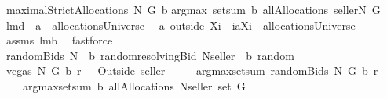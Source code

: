 \begin{isabellebody}
\ {\isachardoublequoteopen}maximalStrictAllocations{\isacharprime}\ N\ G\ b{\isacharequal}{\isacharequal}\isanewline
argmax\ {\isacharparenleft}setsum\ b{\isacharparenright}\ {\isacharparenleft}allAllocations\ {\isacharparenleft}{\isacharbraceleft}seller{\isacharbraceright}{\isasymunion}N{\isacharparenright}\ G{\isacharparenright}{\isachardoublequoteclose}\isanewline
\isanewline
\isanewline
\isanewline
{}\isamarkupfalse%
\ lm{}{}d{\isacharcolon}\ \ {\isachardoublequoteopen}a\ {\isasymin}\ allocationsUniverse{\isachardoublequoteclose}\ \ \isanewline
{\isachardoublequoteopen}{\isacharparenleft}a\ outside\ {\isacharparenleft}X{\isasymunion}{\isacharbraceleft}i{\isacharbraceright}{\isacharparenright}{\isacharparenright}\ {\isasymunion}\ {\isacharparenleft}{\isacharbraceleft}i{\isacharbraceright}{\isasymtimes}{\isacharparenleft}{\isacharbraceleft}{\isasymUnion}{\isacharparenleft}a{\isacharbackquote}{\isacharbackquote}{\isacharparenleft}X{\isasymunion}{\isacharbraceleft}i{\isacharbraceright}{\isacharparenright}{\isacharparenright}{\isacharbraceright}{\isacharminus}{\isacharbraceleft}{\isacharbraceleft}{\isacharbraceright}{\isacharbraceright}{\isacharparenright}{\isacharparenright}\ {\isasymin}\ allocationsUniverse{\isachardoublequoteclose}%
\isadelimproof
\ %
\endisadelimproof
%
\isatagproof
{}\isamarkupfalse%
\ assms\ lm{}{}b\ \isanewline
{}\isamarkupfalse%
\ fastforce%
\endisatagproof
{\isafoldproof}%
%
\isadelimproof
%
\endisadelimproof
\isanewline
\isanewline
\isanewline
\isanewline
{}\isamarkupfalse%
\ {\isachardoublequoteopen}randomBids{\isacharprime}\ N\ {\isasymOmega}\ b\ random{\isacharequal}{\isacharequal}resolvingBid{\isacharprime}\ {\isacharparenleft}N{\isasymunion}{\isacharbraceleft}seller{\isacharbraceright}{\isacharparenright}\ {\isasymOmega}\ b\ random{\isachardoublequoteclose}\isanewline
\isanewline
\isanewline
\isanewline
{}\isamarkupfalse%
\ {\isachardoublequoteopen}vcgas\ N\ G\ b\ r\ \ {\isacharequal}{\isacharequal}\ Outside{\isacharprime}\ {\isacharbraceleft}seller{\isacharbraceright}\ {\isacharbackquote}\ \isanewline
\ \ \ {\isacharparenleft}{\isacharparenleft}argmax{\isasymcirc}setsum{\isacharparenright}\ {\isacharparenleft}randomBids{\isacharprime}\ N\ G\ b\ r{\isacharparenright}\isanewline
\ \ \ \ {\isacharparenleft}{\isacharparenleft}argmax{\isasymcirc}setsum{\isacharparenright}\ b\ {\isacharparenleft}allAllocations\ {\isacharparenleft}N{\isasymunion}{\isacharbraceleft}seller{\isacharbraceright}{\isacharparenright}\ {\isacharparenleft}set\ G{\isacharparenright}{\isacharparenright}{\isacharparenright}{\isacharparenright}{\isachardoublequoteclose}\isanewline

\end{isabellebody}
